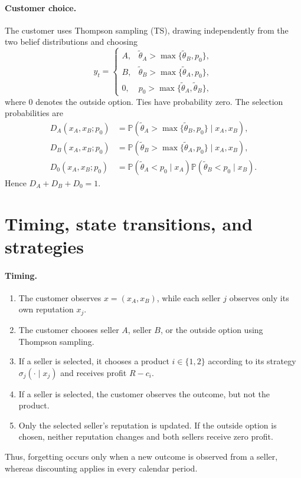 \documentclass[11pt]{article}
\newcommand{\Pb}{\mathbb P}
\begin{document}
\paragraph{Customer choice.}
The customer uses Thompson sampling (TS), drawing independently from the
two belief distributions and choosing
\begin{equation}
y_t=
\begin{cases}
A,&\widetilde\theta_A>\max\{\widetilde\theta_B,p_0\},\\
B,&\widetilde\theta_B>\max\{\widetilde\theta_A,p_0\},\\
0,&p_0>\max\{\widetilde\theta_A,\widetilde\theta_B\},
\end{cases}
\end{equation}
where $0$ denotes the outside option. Ties have probability zero.
The selection probabilities are
\begin{align}
D_A(x_A,x_B;p_0)
&=\Pb(\widetilde\theta_A>\max\{\widetilde\theta_B,p_0\}\mid x_A,x_B),\\
D_B(x_A,x_B;p_0)
&=\Pb(\widetilde\theta_B>\max\{\widetilde\theta_A,p_0\}\mid x_A,x_B),\\
D_0(x_A,x_B;p_0)
&=\Pb(\widetilde\theta_A<p_0\mid x_A)
  \Pb(\widetilde\theta_B<p_0\mid x_B).
\end{align}
Hence $D_A+D_B+D_0=1$.

\section{Timing, state transitions, and strategies}

\paragraph{Timing.}
\begin{enumerate}
    \item The customer observes $x=(x_A,x_B)$, while each
    seller $j$ observes only its own reputation $x_j$.
    
    \item The customer chooses seller $A$, seller $B$, or the outside
    option using Thompson sampling.
    
    \item If a seller is selected, it chooses a product $i\in\{1,2\}$
    according to its strategy $\sigma_j(\cdot\mid x_j)$
    and receives profit $R-c_i$.
    
    \item If a seller is selected, the customer observes the outcome,
    but not the product.
    
    \item Only the selected seller's reputation is updated.
    If the outside option is chosen, neither reputation changes and
    both sellers receive zero profit.
\end{enumerate}
Thus, forgetting occurs only when a new outcome is observed from a seller,
whereas discounting applies in every calendar period.
\end{document}
